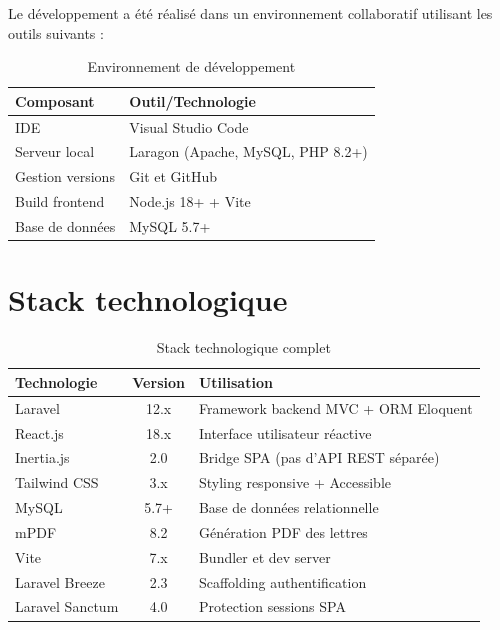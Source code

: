 \documentclass[12pt, a4paper, openright]{report}
\begin{document}
Le développement a été réalisé dans un environnement collaboratif utilisant les outils suivants :

\begin{table}[H]
    \centering
    \small
    \begin{tabular}{|l|l|}
    \hline
    \textbf{Composant} & \textbf{Outil/Technologie} \\
    \hline
    IDE & Visual Studio Code \\
    Serveur local & Laragon (Apache, MySQL, PHP 8.2+) \\
    Gestion versions & Git et GitHub \\
    Build frontend & Node.js 18+ + Vite \\
    Base de données & MySQL 5.7+ \\
    \hline
    \end{tabular}
    \caption{Environnement de développement}
    \label{table:devenv}
\end{table}

\section{Stack technologique}

\begin{table}[H]
    \centering
    \small
    \begin{tabular}{|l|c|p{5cm}|}
    \hline
    \textbf{Technologie} & \textbf{Version} & \textbf{Utilisation} \\
    \hline
    Laravel & 12.x & Framework backend MVC + ORM Eloquent \\
    React.js & 18.x & Interface utilisateur réactive \\
    Inertia.js & 2.0 & Bridge SPA (pas d'API REST séparée) \\
    Tailwind CSS & 3.x & Styling responsive + Accessible \\
    MySQL & 5.7+ & Base de données relationnelle \\
    mPDF & 8.2 & Génération PDF des lettres \\
    Vite & 7.x & Bundler et dev server \\
    Laravel Breeze & 2.3 & Scaffolding authentification \\
    Laravel Sanctum & 4.0 & Protection sessions SPA \\
    \hline
    \end{tabular}
    \caption{Stack technologique complet}
    \label{table:tech}
\end{table}
\end{document}
